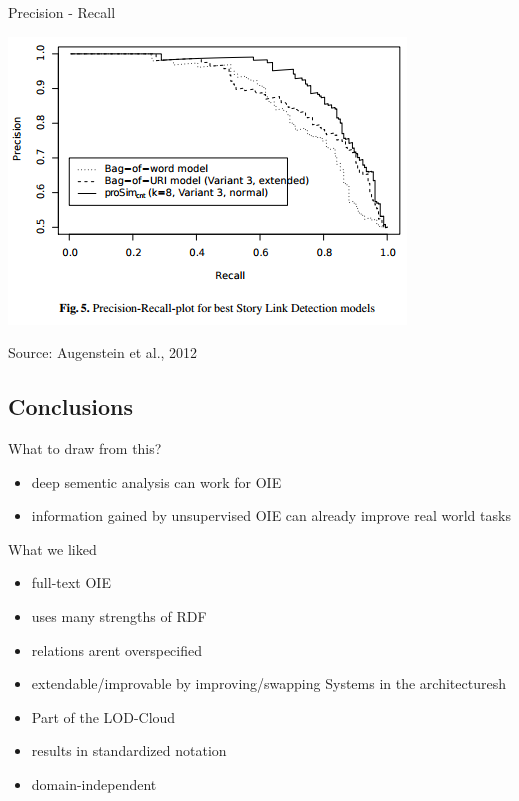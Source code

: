 \documentclass[11pt]{beamer}
\begin{document}
		\begin{frame}{Precision - Recall}
			\begin{center}
				\includegraphics[scale=1]{img/lodifierevaplot.png}
			\end{center}
			\begin{scriptsize}Source: Augenstein et al., 2012\end{scriptsize}
		\end{frame}
	\subsection{Conclusions}
		\begin{frame}{What to draw from this?}
			\begin{itemize}
				\item deep sementic analysis can work for OIE
				\item information gained by unsupervised OIE can already improve real world tasks
			\end{itemize}
		\end{frame}			
		
		\begin{frame}{What we liked}
			\begin{itemize}
				\item<1-7> full-text OIE
				\item<2-7> uses many strengths of RDF
				\item<3-7> relations arent overspecified
				\item<4-7> extendable/improvable by improving/swapping Systems in the architecturesh
				\item<5-7> Part of the LOD-Cloud
				\item<6-7> results in standardized notation
				\item<7> domain-independent
			\end{itemize}
		\end{frame}
		
\end{document}
